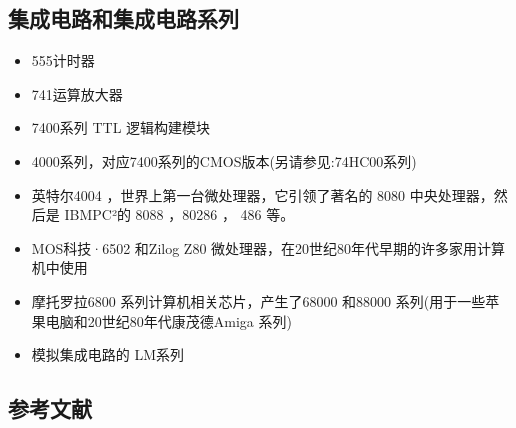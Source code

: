 \subsection{集成电路和集成电路系列}

\begin{itemize}
\item 555计时器
\item 741运算放大器
\item 7400系列 TTL 逻辑构建模块
\item 4000系列，对应7400系列的CMOS版本(另请参见:74HC00系列)
\item 英特尔4004 ，世界上第一台微处理器，它引领了著名的 8080 中央处理器，然后是 IBMPC²的 8088 ，80286 ， 486 等。
\item MOS科技·6502 和Zilog Z80 微处理器，在20世纪80年代早期的许多家用计算机中使用
\item 摩托罗拉6800 系列计算机相关芯片，产生了68000 和88000 系列(用于一些苹果电脑和20世纪80年代康茂德Amiga 系列)
\item 模拟集成电路的 LM系列
\end{itemize}

\subsection{参考文献}

